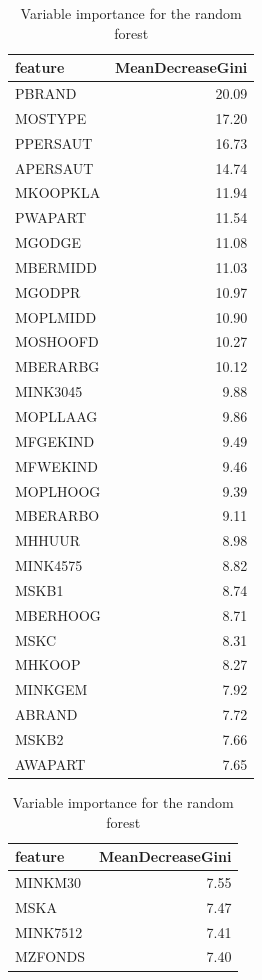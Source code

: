 \documentclass[
  12pt,
  oneside]{report}
\begin{document}
\begin{table}[H]
\caption{\label{tab:RF}Variable importance for the random forest}

\centering
\fontsize{9}{11}\selectfont
\begin{tabular}[t]{l|r}
\hline
feature & MeanDecreaseGini\\
\hline
PBRAND & 20.09\\
\hline
MOSTYPE & 17.20\\
\hline
PPERSAUT & 16.73\\
\hline
APERSAUT & 14.74\\
\hline
MKOOPKLA & 11.94\\
\hline
PWAPART & 11.54\\
\hline
MGODGE & 11.08\\
\hline
MBERMIDD & 11.03\\
\hline
MGODPR & 10.97\\
\hline
MOPLMIDD & 10.90\\
\hline
MOSHOOFD & 10.27\\
\hline
MBERARBG & 10.12\\
\hline
MINK3045 & 9.88\\
\hline
MOPLLAAG & 9.86\\
\hline
MFGEKIND & 9.49\\
\hline
MFWEKIND & 9.46\\
\hline
MOPLHOOG & 9.39\\
\hline
MBERARBO & 9.11\\
\hline
MHHUUR & 8.98\\
\hline
MINK4575 & 8.82\\
\hline
MSKB1 & 8.74\\
\hline
MBERHOOG & 8.71\\
\hline
MSKC & 8.31\\
\hline
MHKOOP & 8.27\\
\hline
MINKGEM & 7.92\\
\hline
ABRAND & 7.72\\
\hline
MSKB2 & 7.66\\
\hline
AWAPART & 7.65\\
\hline
\end{tabular}
\centering
\begin{tabular}[t]{l|r}
\hline
feature & MeanDecreaseGini\\
\hline
MINKM30 & 7.55\\
\hline
MSKA & 7.47\\
\hline
MINK7512 & 7.41\\
\hline
MZFONDS & 7.40\\

\end{tabular}
\end{table}
\end{document}

